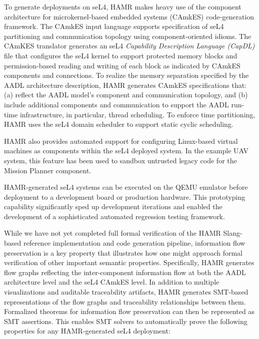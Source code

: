 To generate deployments on seL4, HAMR makes heavy use of the
component architecture for microkernel-based embedded systems
(CAmkES) code-generation framework.   The CAmkES input
language supports specification
of seL4 partitioning and communication topology using
component-oriented idioms.  The CAmKES translator generates an
seL4 \emph{Capability Description Language (CapDL)} file that
configures the seL4 kernel to support protected memory blocks
and permission-based reading and writing of each block as
indicated by CAmkES components and connections.
To realize the memory separation specified by the AADL
architecture description, HAMR generates CAmkES specifications
that: (a) reflect the AADL model's component and communication
topology, and (b) include additional components and communication
to support the AADL run-time infrastructure, in particular,
thread scheduling.
To enforce time partitioning, HAMR uses the seL4 domain
scheduler to support static cyclic scheduling. 

HAMR also provides automated support for configuring Linux-based
virtual machines as components within the seL4 deployed system. 
In the example UAV system, this feature has been used to sandbox untrusted legacy code
for the Mission Planner component.


HAMR-generated seL4 systems can be executed on the QEMU emulator
before deployment to a development board or
production hardware.  This prototyping capability significantly sped up development
iterations and enabled the development of a sophisticated
automated regression testing framework.

While we have not yet completed full formal verification of
the HAMR Slang-based reference implementation and code generation
pipeline, information flow preservation is a key property that 
illustrates how one might approach formal verification of 
other important semantic properties.
Specifically, HAMR generates flow graphs reflecting the
inter-component information flow at both the AADL architecture
level and the seL4 CAmkES level.  In addition to multiple
visualizations and auditable traceability artifacts, HAMR
generates SMT-based representations of the flow graphs and
traceability relationships between them.  Formalized
theorems for information flow preservation can then be represented as
SMT assertions.  This enables SMT solvers to automatically prove
the following properties for any HAMR-generated seL4 deployment:

